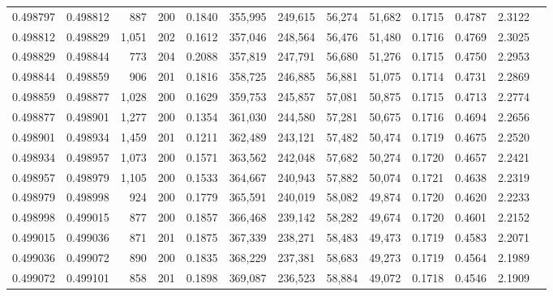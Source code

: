 \begin{tabular}{rrrrrrrrrrrrr}
0.498797 & 0.498812 &   887 & 200 &                                     0.1840 & 355,995 & 249,615 &  56,274 &  51,682 & 0.1715 & 0.4787 & 2.3122 \\
0.498812 & 0.498829 & 1,051 & 202 &                                     0.1612 & 357,046 & 248,564 &  56,476 &  51,480 & 0.1716 & 0.4769 & 2.3025 \\
0.498829 & 0.498844 &   773 & 204 &                                     0.2088 & 357,819 & 247,791 &  56,680 &  51,276 & 0.1715 & 0.4750 & 2.2953 \\
0.498844 & 0.498859 &   906 & 201 &                                     0.1816 & 358,725 & 246,885 &  56,881 &  51,075 & 0.1714 & 0.4731 & 2.2869 \\
0.498859 & 0.498877 & 1,028 & 200 &                                     0.1629 & 359,753 & 245,857 &  57,081 &  50,875 & 0.1715 & 0.4713 & 2.2774 \\
0.498877 & 0.498901 & 1,277 & 200 &                                     0.1354 & 361,030 & 244,580 &  57,281 &  50,675 & 0.1716 & 0.4694 & 2.2656 \\
0.498901 & 0.498934 & 1,459 & 201 &                                     0.1211 & 362,489 & 243,121 &  57,482 &  50,474 & 0.1719 & 0.4675 & 2.2520 \\
0.498934 & 0.498957 & 1,073 & 200 &                                     0.1571 & 363,562 & 242,048 &  57,682 &  50,274 & 0.1720 & 0.4657 & 2.2421 \\
0.498957 & 0.498979 & 1,105 & 200 &                                     0.1533 & 364,667 & 240,943 &  57,882 &  50,074 & 0.1721 & 0.4638 & 2.2319 \\
0.498979 & 0.498998 &   924 & 200 &                                     0.1779 & 365,591 & 240,019 &  58,082 &  49,874 & 0.1720 & 0.4620 & 2.2233 \\
0.498998 & 0.499015 &   877 & 200 &                                     0.1857 & 366,468 & 239,142 &  58,282 &  49,674 & 0.1720 & 0.4601 & 2.2152 \\
0.499015 & 0.499036 &   871 & 201 &                                     0.1875 & 367,339 & 238,271 &  58,483 &  49,473 & 0.1719 & 0.4583 & 2.2071 \\
0.499036 & 0.499072 &   890 & 200 &                                     0.1835 & 368,229 & 237,381 &  58,683 &  49,273 & 0.1719 & 0.4564 & 2.1989 \\
0.499072 & 0.499101 &   858 & 201 &                                     0.1898 & 369,087 & 236,523 &  58,884 &  49,072 & 0.1718 & 0.4546 & 2.1909 \\

\end{tabular}
